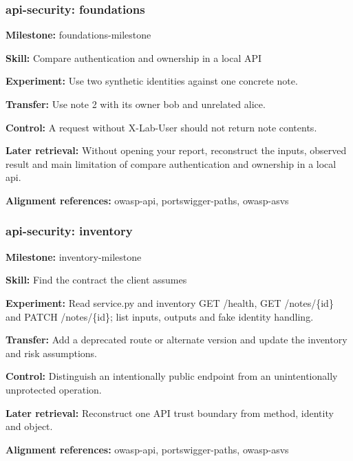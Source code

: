 \subsubsection{api-security: foundations}
\noindent\textbf{Milestone:} foundations-milestone\par
\noindent\textbf{Skill:} Compare authentication and ownership in a local API\par
\noindent\textbf{Experiment:} Use two synthetic identities against one concrete note.\par
\noindent\textbf{Transfer:} Use note 2 with its owner bob and unrelated alice.\par
\noindent\textbf{Control:} A request without X-Lab-User should not return note contents.\par
\noindent\textbf{Later retrieval:} Without opening your report, reconstruct the inputs, observed result and main limitation of compare authentication and ownership in a local api.\par
\noindent\textbf{Alignment references:} owasp-api, portswigger-paths, owasp-asvs\par
\subsubsection{api-security: inventory}
\noindent\textbf{Milestone:} inventory-milestone\par
\noindent\textbf{Skill:} Find the contract the client assumes\par
\noindent\textbf{Experiment:} Read service.py and inventory GET /health, GET /notes/\{id\} and PATCH /notes/\{id\}; list inputs, outputs and fake identity handling.\par
\noindent\textbf{Transfer:} Add a deprecated route or alternate version and update the inventory and risk assumptions.\par
\noindent\textbf{Control:} Distinguish an intentionally public endpoint from an unintentionally unprotected operation.\par
\noindent\textbf{Later retrieval:} Reconstruct one API trust boundary from method, identity and object.\par
\noindent\textbf{Alignment references:} owasp-api, portswigger-paths, owasp-asvs\par
